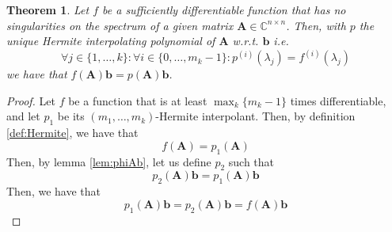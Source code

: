 \documentclass[11pt]{article}
\newtheorem{theorem}{Theorem}[section]
\numberwithin{equation}{section}
\begin{document}
\begin{theorem}\label{thm:KrylovApprox}
    Let $f$ be a sufficiently differentiable function that has no singularities on the spectrum of a given matrix $\mathbf{A}\in\mathbb{C}^{n \times n}$. Then, with $p$ the unique Hermite interpolating polynomial of $\mathbf{A}$ w.r.t. $\mathbf{b}$ i.e. 
    $$\forall j\in\{1,\ldots,k\}:\forall i\in\{0,\ldots,m_k-1\}:p^{(i)}(\lambda_j)=f^{(i)}(\lambda_j)$$
    we have that $f(\mathbf{A})\mathbf{b}=p(\mathbf{A})\mathbf{b}$.
\end{theorem}

\begin{proof}
    Let $f$ be a function that is at least $\max_k\{m_k-1\}$ times differentiable, and let $p_1$ be its $(m_1,\ldots,m_k)$-Hermite interpolant. Then, by definition \ref{def:Hermite}, we have that 
    \begin{equation*}
        f(\mathbf{A}) = p_1(\mathbf{A})
    \end{equation*}
    Then, by lemma \ref{lem:phiAb}, let us define $p_2$ such that
    \begin{equation*}
        p_2(\mathbf{A})\mathbf{b} = p_1(\mathbf{A})\mathbf{b}
    \end{equation*}
    Then, we have that
    \begin{equation*}
        p_1(\mathbf{A})\mathbf{b} = p_2(\mathbf{A})\mathbf{b} = f(\mathbf{A})\mathbf{b}
    \end{equation*}
\end{proof}
\end{document}
